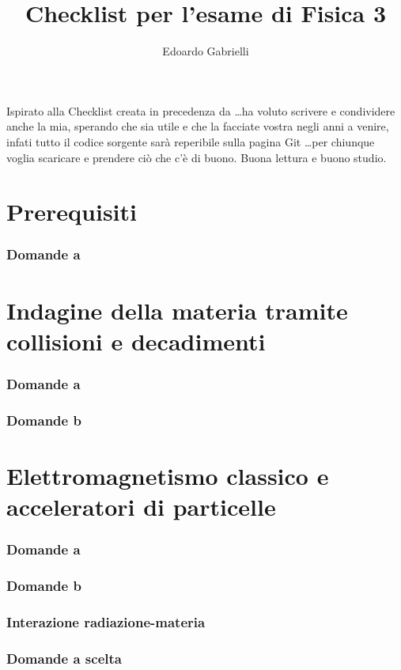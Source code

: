 \documentclass[10pt,a4paper]{article}
\author{Edoardo Gabrielli}
\title{Checklist per l'esame di Fisica 3}
\begin{document}
\maketitle
Ispirato alla Checklist creata in precedenza da \ldots ha voluto scrivere e condividere anche la mia, sperando che sia utile e che la facciate vostra negli anni a venire, infati tutto il codice sorgente sarà reperibile sulla pagina Git \ldots per chiunque voglia scaricare e prendere ciò che c'è di buono. Buona lettura e buono studio.
\clearpage

\begin{multicols}{2}
	\tableofcontents
\end{multicols}

\listoffigures
\clearpage


\part{Prerequisiti}
\section{Domande a}


\part{Indagine della materia tramite collisioni e decadimenti}
\setcounter{section}{0}
\renewcommand*{\theHsection}{chX.\the\value{section}}
\section{Domande a}
\section{Domande b}


\part{Elettromagnetismo classico e acceleratori di particelle}
\setcounter{section}{0}
\renewcommand*{\theHsection}{chX.\the\value{section}}
\section{Domande a}
\section{Domande b}



\section{Interazione radiazione-materia}
\setcounter{section}{0}
\renewcommand*{\theHsection}{chX.\the\value{section}}


\section{Domande a scelta}
 
\end{document}
